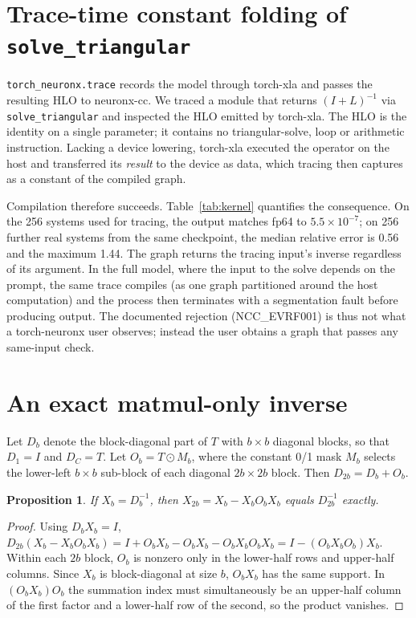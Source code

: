 \documentclass[11pt]{article}
\newtheorem{proposition}{Proposition}
\theoremstyle{remark}
\begin{document}
\section{Trace-time constant folding of \texttt{solve\_triangular}}\label{sec:solve}
\texttt{torch\_neuronx.trace} records the model through torch-xla and passes the resulting HLO to neuronx-cc. We traced a
module that returns $(I+L)^{-1}$ via \texttt{solve\_triangular} and inspected the HLO emitted by torch-xla. The HLO is the
identity on a single parameter; it contains no triangular-solve, loop or arithmetic instruction. Lacking a device lowering,
torch-xla executed the operator on the host and transferred its \emph{result} to the device as data, which tracing then
captures as a constant of the compiled graph.

Compilation therefore succeeds. Table~\ref{tab:kernel} quantifies the consequence. On the 256 systems used for tracing, the
output matches fp64 to $5.5\times10^{-7}$; on 256 further real systems from the same checkpoint, the median relative error is
0.56 and the maximum 1.44. The graph returns the tracing input's inverse regardless of its argument. In the full model, where
the input to the solve depends on the prompt, the same trace compiles (as one graph partitioned around the host computation)
and the process then terminates with a segmentation fault before producing output. The documented rejection (NCC\_EVRF001)
is thus not what a torch-neuronx user observes; instead the user obtains a graph that passes any same-input check.

\section{An exact matmul-only inverse}\label{sec:inverse}
Let $D_b$ denote the block-diagonal part of $T$ with $b\times b$ diagonal blocks, so that $D_1=I$ and $D_C=T$. Let
$O_b = T\odot M_b$, where the constant 0/1 mask $M_b$ selects the lower-left $b\times b$ sub-block of each diagonal
$2b\times2b$ block. Then $D_{2b}=D_b+O_b$.

\begin{proposition}\label{prop:doubling}
If $X_b = D_b^{-1}$, then $X_{2b} = X_b - X_b O_b X_b$ equals $D_{2b}^{-1}$ exactly.
\end{proposition}
\begin{proof}
Using $D_bX_b=I$, $D_{2b}(X_b - X_bO_bX_b) = I + O_bX_b - O_bX_b - O_bX_bO_bX_b = I - (O_bX_bO_b)X_b$. Within each $2b$
block, $O_b$ is nonzero only in the lower-half rows and upper-half columns. Since $X_b$ is block-diagonal at size $b$,
$O_bX_b$ has the same support. In $(O_bX_b)O_b$ the summation index must simultaneously be an upper-half column of the first
factor and a lower-half row of the second, so the product vanishes.
\end{proof}
\end{document}
